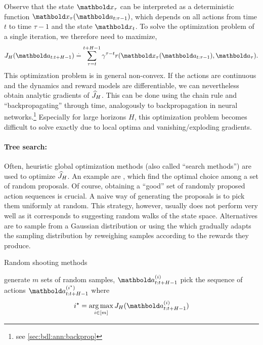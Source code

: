 Observe that the state $\vx_\tau$ can be interpreted as a deterministic function $\vx_\tau(\va_{t:\tau-1})$, which depends on all actions from time $t$ to time $\tau-1$ and the state $\vx_t$.
To solve the optimization problem of a single iteration, we therefore need to maximize, \begin{align}
  \j{\va_{t:t+H-1}}[H] \defeq \sum_{\tau=t}^{t+H-1} \gamma^{\tau-t} r(\vx_\tau(\va_{t:\tau-1}), \va_\tau).
\end{align}
This optimization problem is in general non-convex.
If the actions are continuous and the dynamics and reward models are differentiable, we can nevertheless obtain analytic gradients of $\fnJ[H]$.
This can be done using the chain rule and ``backpropagating'' through time, analogously to backpropagation in neural networks.\footnote{see \cref{sec:bdl:ann:backprop}}
Especially for large horizons $H$, this optimization problem becomes difficult to solve exactly due to local optima and vanishing/exploding gradients.

\paragraph{Tree search:}

Often, heuristic global optimization methods (also called ``search methods'') are used to optimize $\fnJ[H]$.
An example are , which find the optimal choice among a set of random proposals.
Of course, obtaining a ``good'' set of randomly proposed action sequences is crucial.
A naive way of generating the proposals is to pick them uniformly at random.
This strategy, however, usually does not perform very well as it corresponds to suggesting random walks of the state space.
Alternatives are to sample from a Gaussian distribution or using the  which gradually adapts the sampling distribution by reweighing samples according to the rewards they produce.

\begin{algorithm}
  \caption{Random shooting methods}
  generate $m$ sets of random samples, $\va_{t:t+H-1}^{(i)}$\;
  pick the sequence of actions $\va_{t:t+H-1}^{(\opt{i})}$ where \vspace{-8pt}\begin{align}
    \opt{i} = \argmax_{i\in[m]} \j{\va_{t:t+H-1}^{(i)}}[H]
  \end{align}\vspace{-20pt}\;
\end{algorithm}

